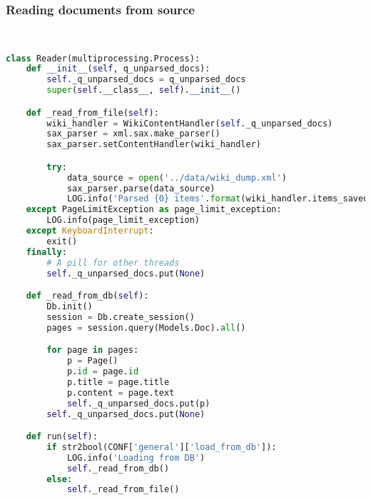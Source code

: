 \subsubsection{Reading documents from source}
\begin{lstlisting}[language=Python, caption=Reader class]


class Reader(multiprocessing.Process):
	def __init__(self, q_unparsed_docs):
		self._q_unparsed_docs = q_unparsed_docs
		super(self.__class__, self).__init__()

	def _read_from_file(self):
		wiki_handler = WikiContentHandler(self._q_unparsed_docs)
		sax_parser = xml.sax.make_parser()
		sax_parser.setContentHandler(wiki_handler)

		try:
			data_source = open('../data/wiki_dump.xml')
			sax_parser.parse(data_source)
			LOG.info('Parsed {0} items'.format(wiki_handler.items_saved))
	except PageLimitException as page_limit_exception:
		LOG.info(page_limit_exception)
	except KeyboardInterrupt:
		exit()
	finally:
		# A pill for other threads
		self._q_unparsed_docs.put(None)

	def _read_from_db(self):
		Db.init()
		session = Db.create_session()
		pages = session.query(Models.Doc).all()

		for page in pages:
			p = Page()
			p.id = page.id
			p.title = page.title
			p.content = page.text
			self._q_unparsed_docs.put(p)
		self._q_unparsed_docs.put(None)	

	def run(self):
		if str2bool(CONF['general']['load_from_db']):
			LOG.info('Loading from DB')
			self._read_from_db()
		else:
			self._read_from_file()
\end{lstlisting}

